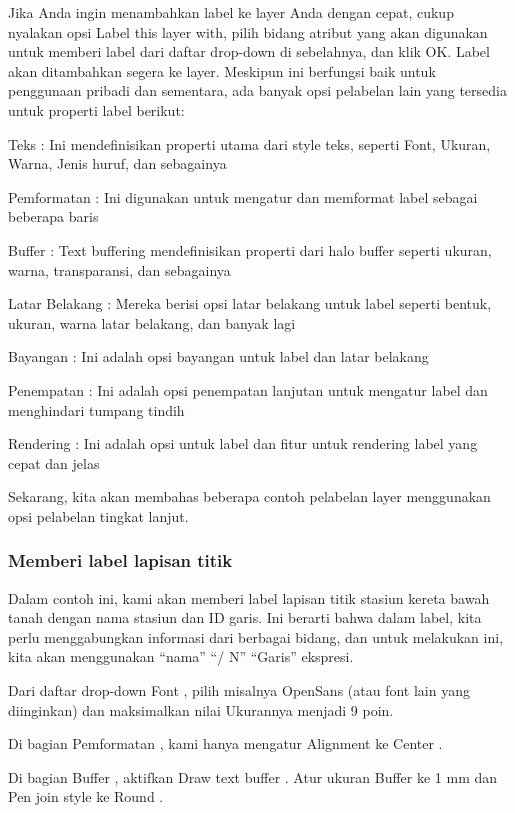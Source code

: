 \documentclass[]{book}
\begin{document}
Jika Anda ingin menambahkan label ke layer Anda dengan cepat, cukup nyalakan opsi Label this layer with, pilih bidang atribut yang akan digunakan untuk memberi label dari daftar drop-down di sebelahnya, dan klik OK. Label akan ditambahkan segera ke layer. Meskipun ini berfungsi baik untuk penggunaan pribadi dan sementara, ada banyak opsi pelabelan lain yang tersedia untuk properti label berikut:

Teks : Ini mendefinisikan properti utama dari style teks, seperti Font, Ukuran, Warna, Jenis huruf, dan sebagainya

Pemformatan : Ini digunakan untuk mengatur dan memformat label sebagai beberapa baris

Buffer : Text buffering mendefinisikan properti dari halo buffer seperti ukuran, warna, transparansi, dan sebagainya

Latar Belakang : Mereka berisi opsi latar belakang untuk label seperti bentuk, ukuran, warna latar belakang, dan banyak lagi

Bayangan : Ini adalah opsi bayangan untuk label dan latar belakang

Penempatan : Ini adalah opsi penempatan lanjutan untuk mengatur label dan menghindari tumpang tindih

Rendering : Ini adalah opsi untuk label dan fitur untuk rendering label yang cepat dan jelas

Sekarang, kita akan membahas beberapa contoh pelabelan layer menggunakan opsi pelabelan tingkat lanjut.

\hypertarget{memberi-label-lapisan-titik}{%
\subsubsection{Memberi label lapisan titik}\label{memberi-label-lapisan-titik}}

Dalam contoh ini, kami akan memberi label lapisan titik stasiun kereta bawah tanah dengan nama stasiun dan ID garis. Ini berarti bahwa dalam label, kita perlu menggabungkan informasi dari berbagai bidang, dan untuk melakukan ini, kita akan menggunakan ``nama'' \textbar{}\textbar{} ``/ N'' \textbar{}\textbar{} ``Garis'' ekspresi.

Dari daftar drop-down Font , pilih misalnya OpenSans (atau font lain yang diinginkan) dan maksimalkan nilai Ukurannya menjadi 9 poin.

Di bagian Pemformatan , kami hanya mengatur Alignment ke Center .

Di bagian Buffer , aktifkan Draw text buffer . Atur ukuran Buffer ke 1 mm dan Pen join style ke Round .
\end{document}
